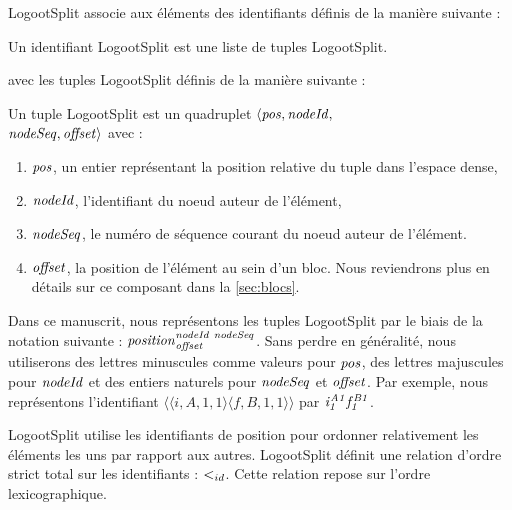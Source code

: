 LogootSplit associe aux éléments des identifiants définis de la manière suivante :

\begin{definition}
  Un identifiant LogootSplit est une liste de tuples LogootSplit.
\end{definition}
avec les tuples LogootSplit définis de la manière suivante :
\begin{definition}
  Un tuple LogootSplit est un quadruplet $\langle \mathit{pos},\mathit{nodeId},$ \\
  $\mathit{nodeSeq},\mathit{offset} \rangle$ avec :
  \begin{enumerate}
    \item $\mathit{pos}$, un entier représentant la position relative du tuple dans l'espace dense,
    \item $\mathit{nodeId}$, l'identifiant du noeud auteur de l'élément,
    \item $\mathit{nodeSeq}$, le numéro de séquence courant du noeud auteur de l'élément.
    \item $\mathit{offset}$, la position de l'élément au sein d'un bloc. Nous reviendrons plus en détails sur ce composant dans la \autoref{sec:blocs}.
  \end{enumerate}
\end{definition}

Dans ce manuscrit, nous représentons les tuples LogootSplit par le biais de la notation suivante : $\mathit{position}^{\mathit{nodeId~nodeSeq}}_{\mathit{offset}}$.
Sans perdre en généralité, nous utiliserons des lettres minuscules comme valeurs pour $\mathit{pos}$, des lettres majuscules pour $\mathit{nodeId}$ et des entiers naturels pour $\mathit{nodeSeq}$ et $\mathit{offset}$.
Par exemple, nous représentons l'identifiant $\langle \langle i,A,1,1 \rangle \langle f,B,1,1 \rangle \rangle$ par $\mathit{i}^{\mathit{A1}}_{\mathit{1}}\mathit{f}^{\mathit{B1}}_{\mathit{1}}$.

LogootSplit utilise les identifiants de position pour ordonner relativement les éléments les uns par rapport aux autres.
LogootSplit définit une relation d'ordre strict total sur les identifiants : $<_{id}$.
Cette relation repose sur l'ordre lexicographique.

